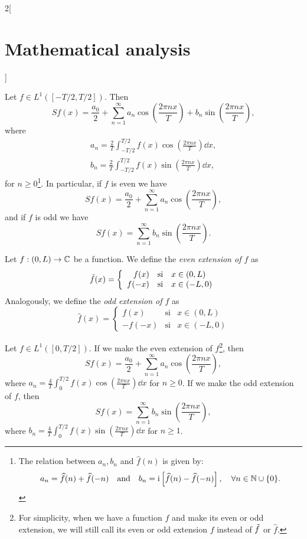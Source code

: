 \documentclass[../../../main.tex]{subfiles}
\begin{document}
\begin{multicols}{2}[\section{Mathematical analysis}]
\begin{definition}
  \end{definition}
  \begin{prop}
    Let $f\in L^1([-T/2,T/2])$. Then $$Sf(x)=\frac{a_0}{2}+\sum_{n=1}^\infty a_n\cos\left(\frac{2\pi nx}{T}\right)+b_n\sin\left(\frac{2\pi nx}{T}\right),$$ where \begin{gather*}
      a_n=\frac{2}{T}\int_{-T/2}^{T/2}f(x)\cos\left(\frac{2\pi nx}{T}\right)\dd x,\\ b_n=\frac{2}{T}\int_{-T/2}^{T/2}f(x)\sin\left(\frac{2\pi nx}{T}\right)\dd x,
    \end{gather*} for $n\geq 0$\footnote{The relation between $a_n,b_n$ and $\widehat{f}(n)$ is given by: $$a_n=\widehat{f}(n)+\widehat{f}(-n)\quad\text{and}\quad b_n=\mathrm{i}\left[\widehat{f}(n)-\widehat{f}(-n)\right],\quad\forall n\in\mathbb{N} \cup\{0\}.$$}. In particular, if $f$ is even we have $$Sf(x)=\frac{a_0}{2}+\sum_{n=1}^\infty a_n\cos\left(\frac{2\pi nx}{T}\right),$$ and if $f$ is odd we have $$Sf(x)=\sum_{n=1}^\infty b_n\sin\left(\frac{2\pi nx}{T}\right).$$
  \end{prop}
  \begin{definition}
    Let $f:(0,L)\rightarrow\mathbb{C} $ be a function. We define the \textit{even extension of $f$} as $$\Tilde{f}(x)=\left\{
      \begin{array}{rcl}
        f(x)  & \text{si} & x\in(0,L)  \\
        f(-x) & \text{si} & x\in(-L,0)
      \end{array}\right.$$ Analogously, we define the \textit{odd extension of $f$} as $$\hat{f}(x)=\left\{
      \begin{array}{rcl}
        f(x)   & \text{si} & x\in(0,L)  \\
        -f(-x) & \text{si} & x\in(-L,0)
      \end{array}\right.$$
  \end{definition}
  \begin{prop}
    Let $f\in L^1([0,T/2])$. If we make the even extension of $f$\footnote{For simplicity, when we have a function $f$ and make its even or odd extension, we will still call its even or odd extension $f$ instead of $\Tilde{f}$ or $\hat{f}$.}, then $$Sf(x)=\frac{a_0}{2}+\sum_{n=1}^\infty a_n\cos\left(\frac{2\pi nx}{T}\right),$$ where $\displaystyle a_n=\frac{4}{T}\int_0^{T/2}f(x)\cos\left(\frac{2\pi nx}{T}\right)\dd x$ for $n\geq 0$. If we make the odd extension of $f$, then $$Sf(x)=\sum_{n=1}^\infty b_n\sin\left(\frac{2\pi nx}{T}\right),$$ where $\displaystyle b_n=\frac{4}{T}\int_0^{T/2}f(x)\sin\left(\frac{2\pi nx}{T}\right)\dd x$ for $n\geq 1$.
  \end{prop}

\end{multicols}
\end{document}
